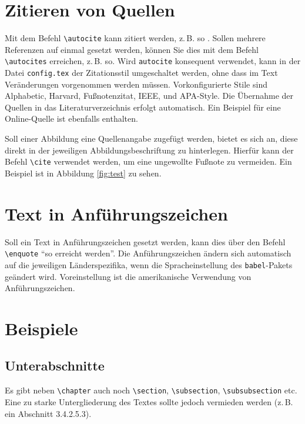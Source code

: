 \section{Zitieren von Quellen}
Mit dem Befehl \texttt{\textbackslash autocite} kann zitiert werden, z.\,B. so \autocite[Vgl.][S. 18ff.]{astm2012AM}. Sollen mehrere Referenzen auf einmal gesetzt werden, können Sie dies mit dem Befehl \texttt{\textbackslash autocites} erreichen, z.\,B. so\autocites[Vgl.][S. 10]{astm2012AM}[][S. 100]{reddy2016AM}. Wird \texttt{autocite} konsequent verwendet, kann in der Datei \texttt{config.tex} der Zitationsstil umgeschaltet werden, ohne dass im Text Veränderungen vorgenommen werden müssen. Vorkonfigurierte Stile sind Alphabetic, Harvard, Fußnotenzitat, IEEE, und APA-Style. Die Übernahme der Quellen in das Literaturverzeichnis erfolgt automatisch. Ein Beispiel für eine Online-Quelle ist ebenfalls enthalten.\autocite[Vgl.][]{3mfconsortium2018adoption}

Soll einer Abbildung eine Quellenangabe zugefügt werden, bietet es sich an, diese direkt in der jeweiligen Abbildungsbeschriftung zu hinterlegen. Hierfür kann der Befehl \texttt{\textbackslash cite} verwendet werden, um eine ungewollte Fußnote zu vermeiden. Ein Beispiel ist in Abbildung \ref{fig:test} zu sehen.


\section{Text in Anführungszeichen}
Soll ein Text in Anführungszeichen gesetzt werden, kann dies über den Befehl \texttt{\textbackslash enquote} \enquote{so erreicht werden}. Die Anführungszeichen ändern sich automatisch auf die jeweiligen Länderspezifika, wenn die Spracheinstellung des \texttt{babel}-Pakets geändert wird. Voreinstellung ist die amerikanische Verwendung von Anführungszeichen.


\section{Beispiele}
\lipsum[1]

\subsection{Unterabschnitte}
Es gibt neben \texttt{\textbackslash chapter} auch noch  \texttt{\textbackslash section}, \texttt{\textbackslash subsection}, \texttt{\textbackslash subsubsection} etc. Eine zu starke Untergliederung des Textes sollte jedoch vermieden werden (z.\,B. ein Abschnitt 3.4.2.5.3).

